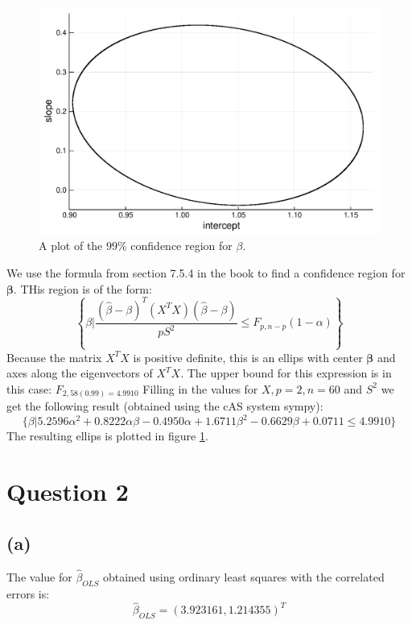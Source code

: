 \documentclass[a4paper]{article}
\begin{document}
\begin{figure}
	\centering
	\includegraphics[width=.9\linewidth]{region-1e.pdf}
	\caption{A plot of the $99\%$ confidence region for $\beta$.}
	\label{fig:1e}
\end{figure}
We use the formula from section 7.5.4 in the book to find a confidence region for $\mathbf{\beta}$. THis region is of the form:
\begin{equation}
	\left\{ \beta \bigg| \frac{(\hat{\beta}-\beta)^T (X^TX) (\hat{\beta}-\beta)}{pS^2} \leq F_{p,n-p}(1-\alpha) \right\}
\end{equation}
Because the matrix $X^TX$ is positive definite, this is an ellips with center $\mathbf{\beta}$ and axes along the eigenvectors of $X^TX$. The upper bound for this expression is in this case: $F_{2,58(0.99) = 4.9910}$ Filling in the values for $X, p=2, n=60$ and $S^2$ we get the following result (obtained using the cAS system sympy):
\begin{equation*}
	\{ \beta | 5.2596 \alpha^{2} + 0.8222 \alpha \beta - 0.4950 \alpha + 1.6711 \beta^{2} - 0.6629 \beta + 0.0711 \leq 4.9910 \}
\end{equation*}
The resulting ellips is plotted in figure \ref{fig:1e}.


\newpage
\section*{Question 2}

\subsection*{(a)}
\noindent {}

The value for $\hat{\beta}_{OLS}$ obtained using ordinary least squares with the correlated errors is:
\begin{equation}
	\hat{\beta}_{OLS} = (3.923161, 1.214355)^T
\end{equation}
\end{document}
